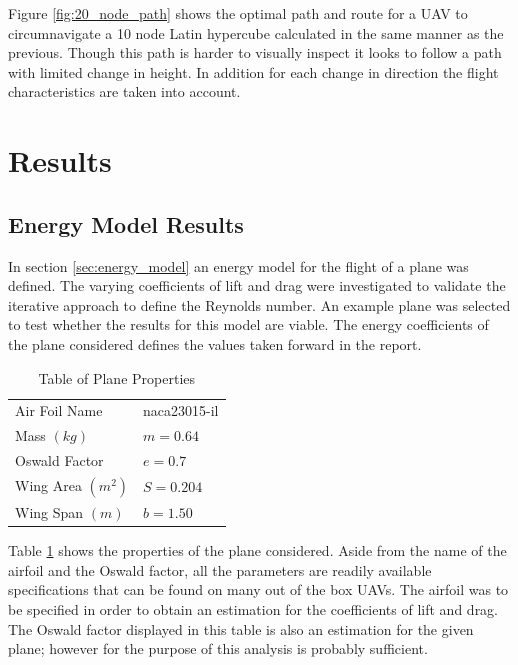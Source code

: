 \documentclass[a4paper,12pt,twoside]{article}
\begin{document}
Figure \ref{fig:20_node_path} shows the optimal path and route for a UAV to circumnavigate a 10 node Latin hypercube calculated in the same manner as the previous. Though this path is harder to visually inspect it looks to follow a path with limited change in height. In addition for each change in direction the flight characteristics are taken into account.

\section{Results}
\label{sec:results}

\subsection{Energy Model Results}
\label{sec:energy_model_results}

In section \ref{sec:energy_model} an energy model for the flight of a plane was defined. The varying coefficients of lift and drag were investigated to validate the iterative approach to define the Reynolds number. An example plane was selected to test whether the results for this model are viable. The energy coefficients of the plane considered defines the values taken forward in the report.

\begin{table}[width=\textwidth]
\centering

    \begin{tabular}{ll}
    Air Foil Name	& naca23015-il	\\
Mass $(kg)$	& $m = 0.64$	\\
Oswald Factor	& $e = 0.7$	\\
Wing Area $(m^2)$	& $S = 0.204$	\\
Wing Span $(m)$	& $b = 1.50$	\\

    \end{tabular}
\caption{Table of Plane Properties}
\label{tbl:table_of_plane_properties}
\end{table}

Table \ref{tbl:table_of_plane_properties} shows the properties of the plane considered. Aside from the name of the airfoil and the Oswald factor, all the parameters are readily available specifications that can be found on many out of the box UAVs. The airfoil was to be specified in order to obtain an estimation for the coefficients of lift and drag. The Oswald factor displayed in this table is also an estimation for the given plane; however for the purpose of this analysis is probably sufficient.
\end{document}
